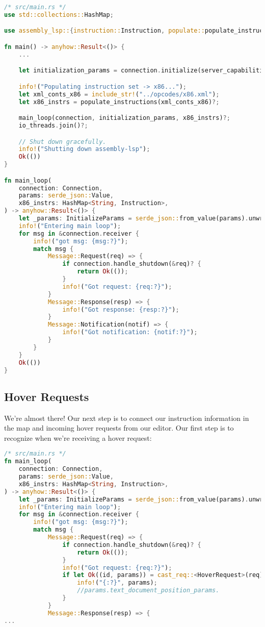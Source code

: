 \begin{lstlisting}[language=rust]
/* src/main.rs */
use std::collections::HashMap;

use assembly_lsp::{instruction::Instruction, populate::populate_instructions};

fn main() -> anyhow::Result<()> {
    ...

    let initialization_params = connection.initialize(server_capabilities)?;

    info!("Populating instruction set -> x86...");
    let xml_conts_x86 = include_str!("../opcodes/x86.xml");
    let x86_instrs = populate_instructions(xml_conts_x86)?;

    main_loop(connection, initialization_params, x86_instrs)?;
    io_threads.join()?;

    // Shut down gracefully.
    info!("Shutting down assembly-lsp");
    Ok(())
}

fn main_loop(
    connection: Connection,
    params: serde_json::Value,
    x86_instrs: HashMap<String, Instruction>,
) -> anyhow::Result<()> {
    let _params: InitializeParams = serde_json::from_value(params).unwrap();
    info!("Entering main loop");
    for msg in &connection.receiver {
        info!("got msg: {msg:?}");
        match msg {
            Message::Request(req) => {
                if connection.handle_shutdown(&req)? {
                    return Ok(());
                }
                info!("Got request: {req:?}");
            }
            Message::Response(resp) => {
                info!("Got response: {resp:?}");
            }
            Message::Notification(notif) => {
                info!("Got notification: {notif:?}");
            }
        }
    }
    Ok(())
}
\end{lstlisting}

\subsection{Hover Requests}

We're almost there! Our next step is to connect our instruction information in the map and incoming hover requests from our editor. Our first step is to recognize when we're receiving a hover request:

\begin{lstlisting}[language=rust]
/* src/main.rs */
fn main_loop(
    connection: Connection,
    params: serde_json::Value,
    x86_instrs: HashMap<String, Instruction>,
) -> anyhow::Result<()> {
    let _params: InitializeParams = serde_json::from_value(params).unwrap();
    info!("Entering main loop");
    for msg in &connection.receiver {
        info!("got msg: {msg:?}");
        match msg {
            Message::Request(req) => {
                if connection.handle_shutdown(&req)? {
                    return Ok(());
                }
                info!("Got request: {req:?}");
                if let Ok((id, params)) = cast_req::<HoverRequest>(req) {
                    info!("{:?}", params);
                    //params.text_document_position_params.
                }
            }
            Message::Response(resp) => {
...
\end{lstlisting}

